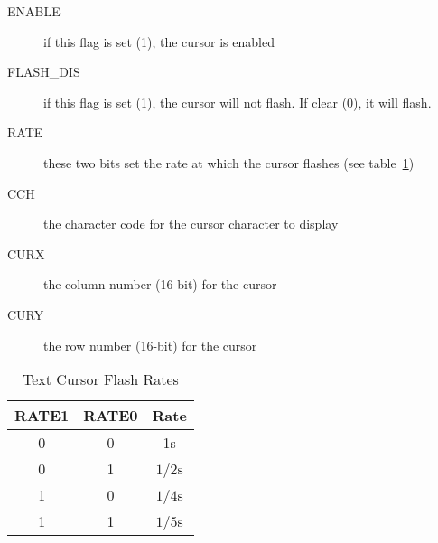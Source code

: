 \begin{description}
    \item[ENABLE] if this flag is set (1), the cursor is enabled

    \item[FLASH\_DIS] if this flag is set (1), the cursor will not flash. If clear (0), it will flash.

    \item[RATE] these two bits set the rate at which the cursor flashes (see table~\ref{tab:txt_crsr_rates})

    \item[CCH] the character code for the cursor character to display

    \item[CURX] the column number (16-bit) for the cursor

    \item[CURY] the row number (16-bit) for the cursor
\end{description}

\begin{table}[ht]
    \begin{center}
        \begin{tabular}{|c|c|c|} \hline
            RATE1 & RATE0 & Rate \\\hline\hline
            0 & 0 & 1s \\ \hline
            0 & 1 & $1/2$s \\ \hline
            1 & 0 & $1/4$s \\ \hline
            1 & 1 & $1/5$s \\ \hline
        \end{tabular}
    \end{center}
    \caption{Text Cursor Flash Rates}
    \label{tab:txt_crsr_rates}
\end{table}
